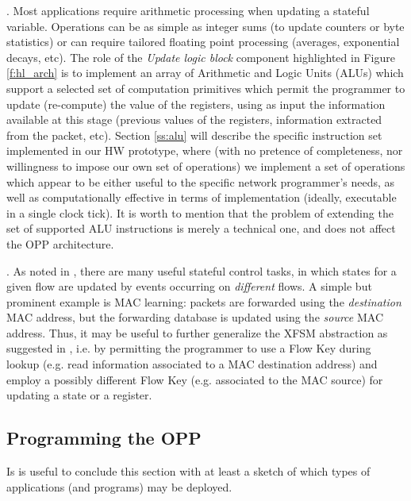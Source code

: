 \documentclass{sig-alternate}
\begin{document}
\vspace{3pt} . Most applications require arithmetic processing when updating a stateful variable. Operations can be as simple as integer sums (to update counters or byte statistics) or can require tailored floating point processing (averages, exponential decays, etc). The role of the {\em Update logic block} component highlighted in Figure \ref{f:hl_arch} is to implement an array of Arithmetic and Logic Units (ALUs) which support a selected set of computation primitives which permit the programmer to update (re-compute) the value of the registers, using as input the information available at this stage (previous values of the registers, information extracted from the packet, etc). Section \ref{ss:alu} will describe the specific instruction set implemented in our HW prototype, where (with no pretence of completeness, nor willingness to impose our own set of operations) we implement a set of operations which appear to be either useful to the specific network programmer's needs, as well as computationally effective in terms of implementation (ideally, executable in a single clock tick). It is worth to mention that the problem of extending the set of supported ALU instructions is merely a technical one, and does not affect the OPP architecture.  

\vspace{3pt} . As noted in \cite{ccr14}, there are many useful stateful control tasks, in which states for a given flow are updated by events occurring on {\em different} flows. A simple but prominent example is MAC learning: packets are forwarded using the {\em destination} MAC address, but the forwarding database is updated using the {\em source} MAC address. Thus, it may be useful to further generalize the XFSM abstraction as suggested in \cite{ccr14}, i.e. by permitting the programmer to use a Flow Key during lookup (e.g. read information associated to a MAC destination address) and employ a possibly different Flow Key (e.g. associated to the MAC source) for updating a state or a register.

\subsection{Programming the OPP}

Is is useful to conclude this section with at least a sketch of which types of applications (and programs) may be deployed. 
\end{document}
